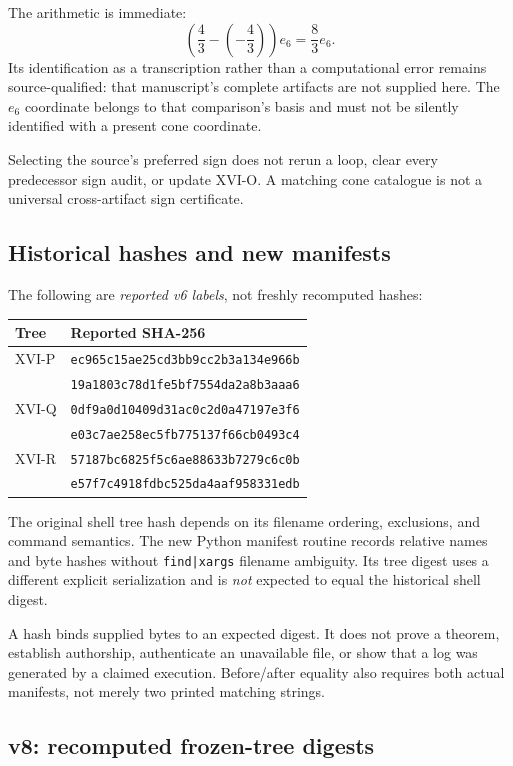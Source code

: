 \documentclass[11pt,a4paper]{article}
\newcommand{\loc}[1]{\nolinkurl{#1}}
\theoremstyle{plain}
\theoremstyle{definition}
\theoremstyle{remark}
\numberwithin{equation}{section}
\begin{document}
The arithmetic is immediate:
\[
 \left(\frac43-\left(-\frac43\right)\right)e_6
 =\frac83e_6.
\]
Its identification as a transcription rather than a computational
error remains source-qualified: that manuscript's complete
artifacts are not supplied here.
The \(e_6\) coordinate belongs to that comparison's basis and
must not be silently identified with a present cone coordinate.

Selecting the source's preferred sign does not rerun a loop,
clear every predecessor sign audit, or update XVI-O.
A matching cone catalogue is not a universal cross-artifact
sign certificate.

\subsection{Historical hashes and new manifests}

The following are \emph{reported v6 labels}, not freshly
recomputed hashes:
\begin{center}
\scriptsize
\begin{tabular}{@{}ll@{}}
\toprule
Tree & Reported SHA-256\\
\midrule
XVI-P &
\texttt{ec965c15ae25cd3bb9cc2b3a134e966b}\\
&\texttt{19a1803c78d1fe5bf7554da2a8b3aaa6}\\
XVI-Q &
\texttt{0df9a0d10409d31ac0c2d0a47197e3f6}\\
&\texttt{e03c7ae258ec5fb775137f66cb0493c4}\\
XVI-R &
\texttt{57187bc6825f5c6ae88633b7279c6c0b}\\
&\texttt{e57f7c4918fdbc525da4aaf958331edb}\\
\bottomrule
\end{tabular}
\end{center}

The original shell tree hash depends on its filename ordering,
exclusions, and command semantics. The new Python manifest
routine records relative names and byte hashes without
\loc{find|xargs} filename ambiguity. Its tree digest uses a
different explicit serialization and is \emph{not} expected to
equal the historical shell digest.

A hash binds supplied bytes to an expected digest. It does not
prove a theorem, establish authorship, authenticate an
unavailable file, or show that a log was generated by a claimed
execution. Before/after equality also requires both actual
manifests, not merely two printed matching strings.


\subsection{v8: recomputed frozen-tree digests}
\label{sec:v8hash}
\end{document}
